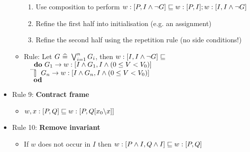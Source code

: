 \begin{itemize}
\begin{itemize}
\begin{enumerate}
			\item Use composition to perform $ w : [P, I \land \lnot G] \mathrel{\sqsubseteq} w : [P, I]; w : [I, I \land \lnot G] $
			
			\item Refine the first half into initialisation (e.g. an assignment)
			
			\item Refine the second half using the repetition rule (no side conditions!)
			
		\end{enumerate}
	
	\item Rule: Let $ G ~ \widehat{=} ~ \bigvee_{i=1}^{n} G_i $, then $ w : [I, I \land \lnot G] \mathrel{\sqsubseteq}$\\
	$ ~~~~ {\bf do} ~ G_1 \rightarrow w : [I \land G_1, I \land (0 \le V < V_0)] $\\
	$ ~~~~ \dots $\\
	$ ~~~~ \mathrel{\tt [\hspace*{-1pt}]} ~ G_n \rightarrow w : [I \land G_n, I \land (0 \le V < V_0)] $\\
	$ ~~~~ {\bf od} $
	
	\end{itemize}

	\item Rule 9: \textbf{Contract frame}
	
	\begin{itemize}
		
		\item $ w, x : [P, Q] \mathrel{\sqsubseteq} w : [P, Q[x_0 \backslash x]] $
		
	\end{itemize}

	\item Rule 10: \textbf{Remove invariant}
	
	\begin{itemize}
		
		\item If $ w $ does not occur in $ I $ then $ w : [P \land I, Q \land I] \mathrel{\sqsubseteq} w : [P, Q] $
		
	\end{itemize}
	
\end{itemize}